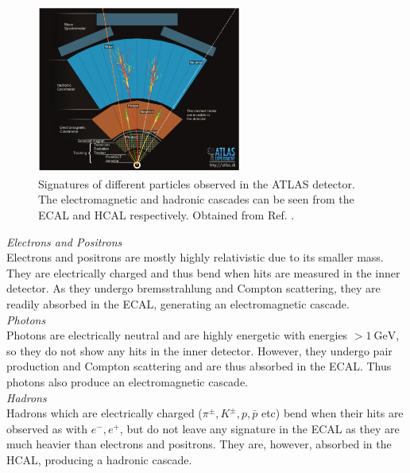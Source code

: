 \documentclass[a4paper]{report}
\numberwithin{equation}{section}
\begin{document}
\begin{figure}[htpb]
    \centering
    \includegraphics[width=0.6\textwidth]{detector_signatures.png}
    \caption{Signatures of different particles observed in the ATLAS detector. The electromagnetic and hadronic cascades can be seen from the ECAL and HCAL 
	respectively. Obtained from Ref. \cite{Gerber2019}. }
    \label{fig:detector_signatures}
\end{figure}
\bigbreak
\noindent \textit{Electrons and Positrons} \\ 

Electrons and positrons are mostly highly relativistic due to its smaller mass. They are electrically charged and thus bend when 
hits are measured in the inner detector. As they undergo bremsstrahlung and Compton scattering, they are readily absorbed in the ECAL, 
generating an electromagnetic cascade. \\

\noindent \textit{Photons} \\

Photons are electrically neutral and are highly energetic with energies $> \SI{1}{\giga\electronvolt}$, so they do not show any hits
 in the inner detector. However, they undergo pair production and Compton scattering and are thus absorbed in the ECAL. Thus photons 
 also produce an electromagnetic cascade. \\

 \noindent \textit{Hadrons} \\

 Hadrons which are electrically charged ($\pi^\pm, K^\pm, p, \bar{p}$ etc) bend when their hits are observed as with $e^-, e^+$, 
but do not leave any signature in the ECAL as they are much heavier than electrons and positrons. They are, however, absorbed in the HCAL, 
producing a hadronic cascade. \par 
\end{document}
